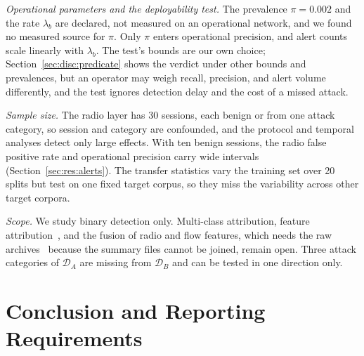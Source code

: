 \documentclass{ieeeaccess}
\newcommand{\DA}{\ensuremath{\mathcal{D}_{A}}}
\newcommand{\DB}{\ensuremath{\mathcal{D}_{B}}}
\begin{document}
\emph{Operational parameters and the deployability test.} The prevalence $\pi = 0.002$ and the rate $\lambda_b$ are declared, not measured on an operational network, and we found no measured source for $\pi$. Only $\pi$ enters operational precision, and alert counts scale linearly with $\lambda_b$. The test's bounds are our own choice; Section~\ref{sec:disc:predicate} shows the verdict under other bounds and prevalences, but an operator may weigh recall, precision, and alert volume differently, and the test ignores detection delay and the cost of a missed attack.

\emph{Sample size.} The radio layer has 30 sessions, each benign or from one attack category, so session and category are confounded, and the protocol and temporal analyses detect only large effects. With ten benign sessions, the radio false positive rate and operational precision carry wide intervals (Section~\ref{sec:res:alerts}). The transfer statistics vary the training set over 20 splits but test on one fixed target corpus, so they miss the variability across other target corpora.

\emph{Scope.} We study binary detection only. Multi-class attribution, feature attribution~\cite{lundberg2017shap}, and the fusion of radio and flow features, which needs the raw archives~\cite{fard2026crosslayer} because the summary files cannot be joined, remain open. Three attack categories of \DA{} are missing from \DB{} and can be tested in one direction only.

\section{Conclusion and Reporting Requirements}
\label{sec:conclusion}
\end{document}
